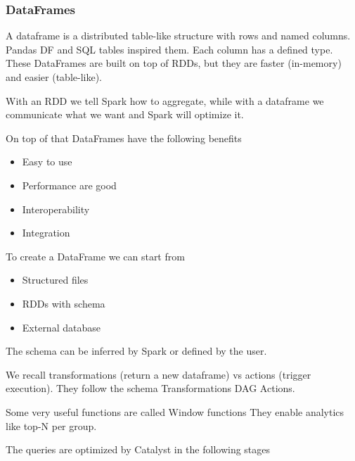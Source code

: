 \subsubsection{DataFrames}

A dataframe is a distributed table-like structure with rows and named columns. Pandas DF and SQL tables inspired them. Each column has a defined type. These DataFrames are built on top of RDDs, but they are faster (in-memory) and easier (table-like).

\vspace{10pt}

With an RDD we tell Spark how to aggregate, while with a dataframe we communicate what we want and Spark will optimize it. 

\vspace{10pt}

On top of that DataFrames have the following benefits

\begin{itemize}
    \item Easy to use
    \item Performance are good
    \item Interoperability
    \item Integration
\end{itemize}

To create a DataFrame we can start from

\begin{itemize}
    \item Structured files
    \item RDDs with schema
    \item External database
\end{itemize}

The schema can be inferred by Spark or defined by the user.

\vspace{10pt}

We recall transformations (return a new dataframe) vs actions (trigger execution). They follow the schema Transformations \ra DAG \ra Actions.

\vspace{10pt}

Some very useful functions are called Window functions \ra They enable analytics like top-N per group.

\vspace{10pt}

The queries are optimized by Catalyst in the following stages

